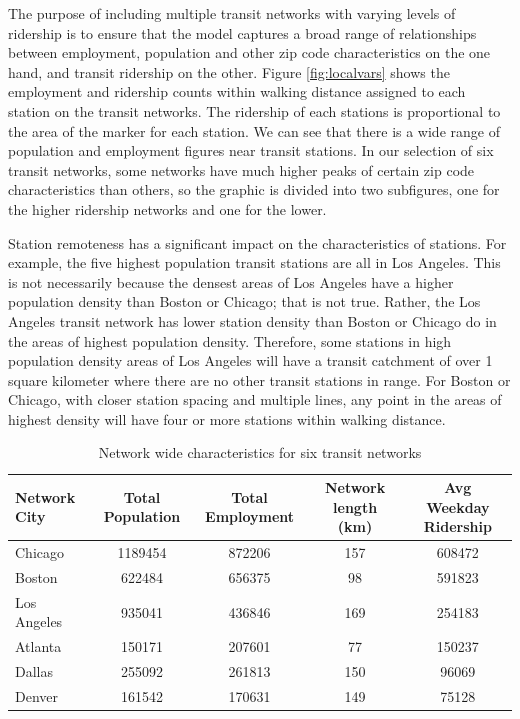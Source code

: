 \documentclass[11pt]{article}
\begin{document}
The purpose of including multiple transit networks with varying levels of ridership is to ensure that the model captures a broad range of relationships between employment, population and other zip code characteristics on the one hand, and transit ridership on the other. Figure \ref{fig:localvars} shows the employment and ridership counts within walking distance assigned to each station on the transit networks. The ridership of each stations is proportional to the area of the marker for each station. We can see that there is a wide range of population and employment figures near transit stations. In our selection of six transit networks, some networks have much higher peaks of certain zip code characteristics than others, so the graphic is divided into two subfigures, one for the higher ridership networks and one for the lower. 

Station remoteness has a significant impact on the characteristics of stations. For example, the five highest population transit stations are all in Los Angeles. This is not necessarily because the densest areas of Los Angeles have a higher population density than Boston or Chicago; that is not true. Rather, the Los Angeles transit network has lower station density than Boston or Chicago do in the areas of highest population density. Therefore, some stations in high population density areas of Los Angeles will have a transit catchment of over 1 square kilometer where there are no other transit stations in range. For Boston or Chicago, with closer station spacing and multiple lines, any point in the areas of highest density will have four or more stations within walking distance.  

\begin{table}
\centering\begingroup\fontsize{10}{10}\selectfont
\begin{tabular}{l|cccc}
\toprule Network City&Total Population&Total Employment&Network length (km)&Avg Weekday Ridership \\ 
\midrule Chicago&1189454&872206&157&608472\\
Boston&622484&656375&98&591823\\
Los Angeles&935041&436846&169&254183\\
Atlanta&150171&207601&77&150237\\
Dallas&255092&261813&150&96069\\
Denver&161542&170631&149&75128\\
\bottomrule
\end{tabular}\endgroup
\caption{Network wide characteristics for six transit networks}\label{tab:netsize}
\end{table}
\end{document}
